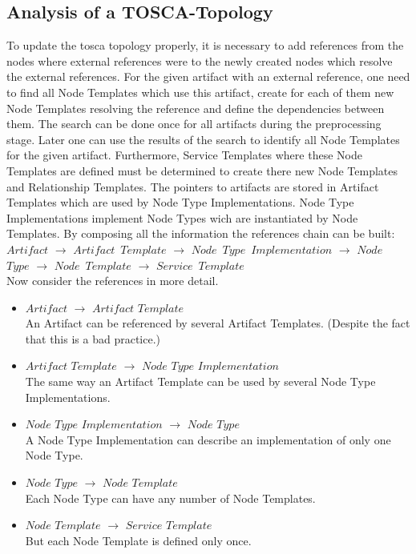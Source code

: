 \subsection{Analysis of a TOSCA-Topology}\label{subs:analyse}
To update the \gls{tosca} topology properly, it is necessary to add references from the nodes where external references were to the newly created nodes which resolve the external references. 
For the given artifact with an external reference, one need to find all Node Templates which use this artifact, create for each of them new Node Templates resolving the reference and define the dependencies between them.
The search can be done once for all artifacts during the preprocessing stage.
Later one can use the results of the search to identify all Node Templates for the given artifact.
Furthermore, Service Templates where these Node Templates are defined must be determined to create there new Node Templates and Relationship Templates.
The pointers to artifacts are stored in Artifact Templates which are used by Node Type Implementations.
Node Type Implementations implement Node Types wich are instantiated by Node Templates.
By composing all the information the references chain can be built:\\
$Artifact$ $\rightarrow$ $Artifact$~$Template$ $\rightarrow$ $Node$~$Type$~$Implementation$ $\rightarrow$ $Node$~$Type$ $\rightarrow$ $Node$~$Template$ $\rightarrow$ $Service$~$Template$\\
Now consider the references in more detail. 
\begin{itemize}
	\item $Artifact$ $\rightarrow$ $Artifact$ $Template$\\
	An Artifact can be referenced by several Artifact Templates. (Despite the fact that this is a bad practice.)
	\item  $Artifact$ $Template$ $\rightarrow$ $Node$ $Type$ $Implementation$ \\
	The same way an Artifact Template can be used by several Node Type Implementations.
	\item $Node$ $Type$ $Implementation$ $\rightarrow$ $Node$ $Type$ \\
	A Node Type Implementation can describe an implementation of only one Node Type.
	\item  $Node$ $Type$ $\rightarrow$ $Node$ $Template$\\
	Each Node Type can have any number of Node Templates.
	\item  $Node$ $Template$ $\rightarrow$ $Service$ $Template$\\
	But each Node Template is defined only once.
\end{itemize}
